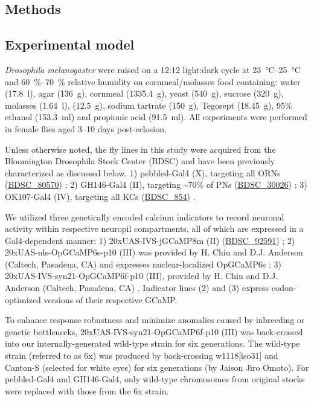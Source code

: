 \documentclass[12pt]{caltech_thesis}
\renewcommand{\cite}{{ }\autocite}
\let\Oldsection\section
\renewcommand{\section}{\FloatBarrier\Oldsection}
\let\Oldsubsection\subsection
\renewcommand{\subsection}{\FloatBarrier\Oldsubsection}
\newcommand{\bdsc}[1]{\href{https://bdsc.indiana.edu/stocks/#1}{BDSC\_#1}}
\begin{document}
\begin{refsection}
\processdelayedfloats

\section{Methods}
\subsection{Experimental model}
\textit{Drosophila melanogaster} were raised on a 12:12 light:dark cycle at \qtyrange{23}{25}{\degreeCelsius} and \qtyrange{60}{70}{\percent} relative humidity on cornmeal/molasses food containing: water (\qty{17.8}{\litre}), agar (\qty{136}{\gram}), cornmeal (\qty{1335.4}{\gram}), yeast (\qty{540}{\gram}), sucrose (\qty{320}{\gram}), molasses (\qty{1.64}{\litre}),  (\qty{12.5}{\gram}), sodium tartrate (\qty{150}{\gram}), Tegosept (\qty{18.45}{\gram}), 95\% ethanol (\qty{153.3}{\milli\litre}) and propionic acid (\qty{91.5}{\milli\litre}).
All experiments were performed in female flies aged \numrange{3}{10} days post-eclosion.

Unless otherwise noted, the fly lines in this study were acquired from the Bloomington Drosophila Stock Center (BDSC) and have been previously characterized as discussed below.
1) pebbled-Gal4 (X), targeting all ORNs (\bdsc{80570})\cite{pebbled};
2) GH146-Gal4 (II), targeting \textasciitilde70\% of PNs (\bdsc{30026})\cite{GH146};
3) OK107-Gal4 (IV), targeting all KCs (\bdsc{854})\cite{OK107}.

We utilized three genetically encoded calcium indicators to record neuronal activity within respective neuropil compartments, all of which are expressed in a Gal4-dependent manner:
1) 20xUAS-IVS-jGCaMP8m (II) (\bdsc{92591})\cite{jGCaMP8};
2) 20xUAS-nls-OpGCaMP6s-p10 (III) was provided by H. Chiu and D.J. Anderson (Caltech, Pasadena, CA) and expresses nuclear-localized OpGCaMP6s\cite{CodonOptimizedGCaMP6s};
3) 20xUAS-IVS-syn21-OpGCaMP6f-p10 (III), provided by H. Chiu and D.J. Anderson (Caltech, Pasadena, CA)\cite{Gen6GCaMPs}.
Indicator lines (2) and (3) express codon-optimized versions of their respective GCaMP.

To enhance response robustness and minimize anomalies caused by inbreeding or genetic bottlenecks, 20xUAS-IVS-syn21-OpGCaMP6f-p10 (III) was back-crossed into our internally-generated wild-type strain for six generations.
The wild-type strain (referred to as 6x) was produced by back-crossing w1118[iso31] and Canton-S (selected for white eyes) for six generations (by Jaison Jiro Omoto).
For pebbled-Gal4 and GH146-Gal4, only wild-type chromosomes from original stocks were replaced with those from the 6x strain.


\end{refsection}
\end{document}
